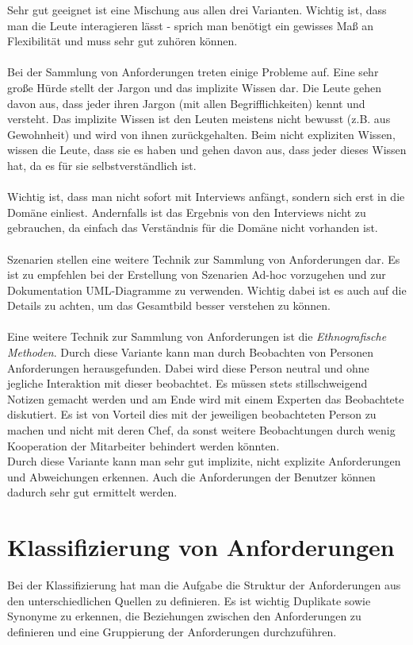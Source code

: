 Sehr gut geeignet ist eine Mischung aus allen drei Varianten. Wichtig ist, dass man die Leute interagieren lässt - sprich man benötigt ein gewisses Maß an Flexibilität und muss sehr gut zuhören können. 
\\\\
Bei der Sammlung von Anforderungen treten einige Probleme auf. Eine sehr große Hürde stellt der Jargon und das implizite Wissen dar. Die Leute gehen davon aus, dass jeder ihren Jargon (mit allen Begrifflichkeiten) kennt und versteht. Das implizite Wissen ist den Leuten meistens nicht bewusst (z.B. aus Gewohnheit) und wird von ihnen zurückgehalten. Beim nicht expliziten Wissen, wissen die Leute, dass sie es haben und gehen davon aus, dass jeder dieses Wissen hat, da es für sie selbstverständlich ist. 
\\\\
Wichtig ist, dass man nicht sofort mit Interviews anfängt, sondern sich erst in die Domäne einliest. Andernfalls ist das Ergebnis von den Interviews nicht zu gebrauchen, da einfach das Verständnis für die Domäne nicht vorhanden ist.
\\\\
Szenarien stellen eine weitere Technik zur Sammlung von Anforderungen dar. Es ist zu empfehlen bei der Erstellung von Szenarien Ad-hoc vorzugehen und zur Dokumentation UML-Diagramme zu verwenden. Wichtig dabei ist es auch auf die Details zu achten, um das Gesamtbild besser verstehen zu können.
\\\\
Eine weitere Technik zur Sammlung von Anforderungen ist die \textit{Ethnografische Methoden}. Durch diese Variante kann man durch Beobachten von Personen Anforderungen herausgefunden. Dabei wird diese Person neutral und ohne jegliche Interaktion mit dieser beobachtet. Es müssen stets stillschweigend Notizen gemacht werden und am Ende wird mit einem Experten das Beobachtete diskutiert. Es ist von Vorteil dies  mit der jeweiligen beobachteten Person zu machen und nicht mit deren Chef, da sonst weitere Beobachtungen durch wenig Kooperation der Mitarbeiter behindert werden könnten. 
\\
Durch diese Variante kann man sehr gut implizite, nicht explizite Anforderungen und Abweichungen erkennen. Auch die Anforderungen der Benutzer können dadurch sehr gut ermittelt werden. 

\section{Klassifizierung von Anforderungen}
Bei der Klassifizierung hat man die Aufgabe die Struktur der Anforderungen aus den unterschiedlichen Quellen zu definieren. 
Es ist wichtig Duplikate sowie Synonyme zu erkennen, die Beziehungen zwischen den Anforderungen zu definieren und eine Gruppierung der Anforderungen durchzuführen.

